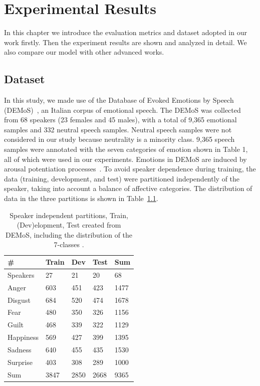 \chapter{Experimental Results}
\label{chap:experiment}
In this chapter we introduce the evaluation metrics and dataset adopted in our work firstly. Then the experiment results are shown and analyzed in detail. We also compare our model with other advanced works.

\section{Dataset}

In this study, we made use of the Database of Evoked Emotions by Speech (DEMoS)~\cite{parada2020demos}, an Italian corpus of emotional speech. The DEMoS was collected from 68 speakers (23 females and 45 males), with a total of 9,365 emotional samples and 332 neutral speech samples. Neutral speech samples were not considered in our study because neutrality is a minority class. 9,365 speech samples were annotated with the seven categories of emotion shown in Table 1, all of which were used in our experiments. Emotions in DEMoS are induced by arousal potentiation processes~\cite{parada2020demos}. To avoid speaker dependence during training, the data (training, development, and test) were partitioned independently of the speaker, taking into account a balance of affective categories. The distribution of data in the three partitions is shown in Table~\ref{table:database}.
\begin{table}[]
	\centering
	\begin{tabular}{l|llll}
		\hline
		\#        & Train & Dev  & Test & Sum  \\ \hline
		Speakers  & 27    & 21   & 20   & 68   \\ \hline
		Anger     & 603   & 451  & 423  & 1477 \\
		Disgust   & 684   & 520  & 474  & 1678 \\
		Fear      & 480   & 350  & 326  & 1156 \\
		Guilt     & 468   & 339  & 322  & 1129 \\
		Happiness & 569   & 427  & 399  & 1395 \\
		Sadness   & 640   & 455  & 435  & 1530 \\
		Surprise  & 403   & 308  & 289  & 1000 \\
		Sum       & 3847  & 2850 & 2668 & 9365
	\end{tabular}
	\caption{Speaker independent partitions, Train, (Dev)elopment, Test created from DEMoS, including the distribution of the 7-classes .}
	\label{table:database}
\end{table}


